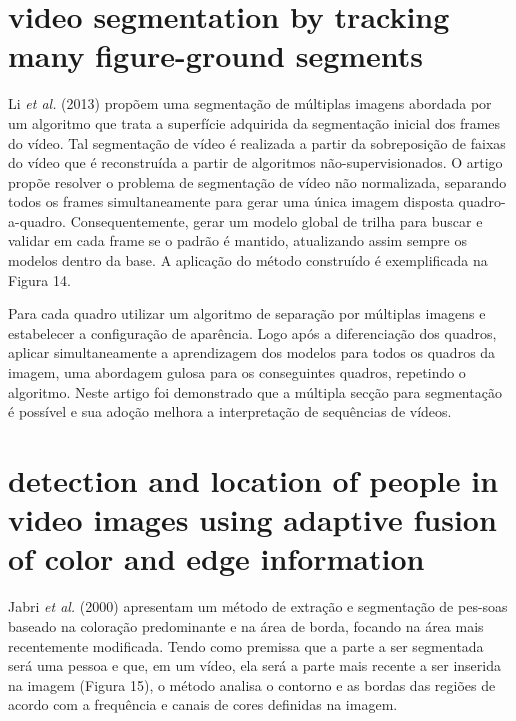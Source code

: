 \documentclass[12pt,oneside,a4paper,chapter=TITLE,section=TITLE,sumario=tradicional]{abntex2}
\begin{document}
\section{video segmentation by tracking many figure-ground segments}
Li \textit{et al.} (2013) propõem uma segmentação de múltiplas imagens abordada por um algoritmo que trata a superfície adquirida da segmentação inicial dos frames do vídeo. Tal segmentação de vídeo é realizada a partir da sobreposição de faixas do vídeo que é reconstruída a partir de algoritmos não-supervisionados.
O artigo propõe resolver o problema de segmentação de vídeo não normalizada, separando todos os frames simultaneamente para gerar uma única imagem disposta quadro-a-quadro. Consequentemente, gerar um modelo global de trilha para buscar e validar em cada frame se o padrão é mantido, atualizando assim sempre os modelos dentro da base. A aplicação do método construído é exemplificada na Figura 14.

\begin{figure}[htb]
\end{figure}

Para cada quadro utilizar um algoritmo de separação por múltiplas imagens e estabelecer a configuração de aparência. Logo após a diferenciação dos quadros, aplicar simultaneamente a aprendizagem dos modelos para todos os quadros da imagem, uma abordagem gulosa para os conseguintes quadros, repetindo o algoritmo. Neste artigo foi demonstrado que a múltipla secção para segmentação é possível e sua adoção melhora a interpretação de sequências de vídeos.

\section{detection and location of people in video images using adaptive fusion of color and edge information}
Jabri \textit{et al.} (2000) apresentam um método de extração e segmentação de pes-soas baseado na coloração predominante e na área de borda, focando na área mais recentemente modificada. Tendo como premissa que a parte a ser segmentada será uma pessoa e que, em um vídeo, ela será a parte mais recente a ser inserida na imagem (Figura 15), o método analisa o contorno e as bordas das regiões de acordo com a frequência e canais de cores definidas na imagem.
\end{document}
